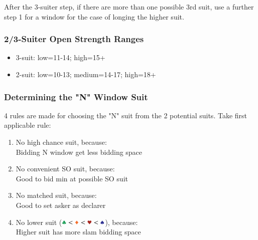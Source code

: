 \documentclass{article}
\begin{document}
\begin{multicols}{2}
\noindent After the 3-suiter step, if there are more than one possible 3rd suit, use a further step 1 for a window for the case of longing the higher suit.

\subsubsection{2/3-Suiter Open Strength Ranges}
\begin{itemize}
    \item 3-suit: low=11-14; high=15+
    \item 2-suit: low=10-13; medium=14-17; high=18+
\end{itemize}

\subsubsection{Determining the "N" Window Suit}\label{sec:determine-n-suit}
4 rules are made for choosing the "N" suit from the 2 potential suits. Take first applicable rule:
\begin{enumerate}
    \item No high chance suit, because:\\
    Bidding N window get less bidding space
    \item No convenient SO suit, because:\\
    Good to bid min at possible SO suit
    \item No matched suit, because:\\
    Good to set asker as declarer
    \item No lower suit ($\ccc<\ddd<\hhh<\sss$), because:\\
    Higher suit has more slam bidding space
\end{enumerate}


\end{multicols}
\end{document}
